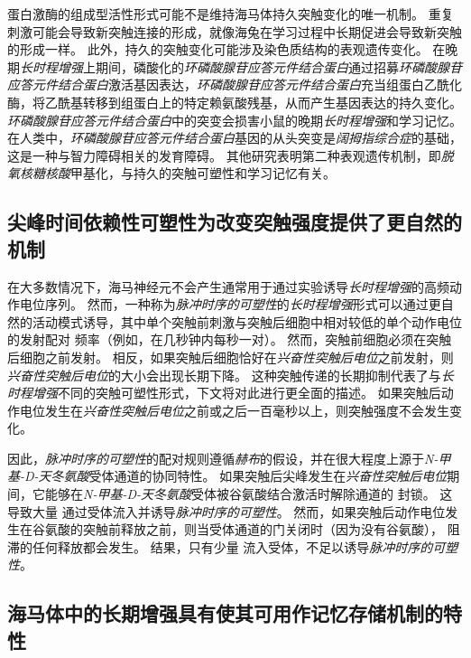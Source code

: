 蛋白激酶的组成型活性形式可能不是维持海马体持久突触变化的唯一机制。
重复刺激可能会导致新突触连接的形成，就像海兔在学习过程中长期促进会导致新突触的形成一样。
此外，持久的突触变化可能涉及染色质结构的表观遗传变化。
在晚期\textit{长时程增强}上期间，磷酸化的\textit{环磷酸腺苷应答元件结合蛋白}通过招募\textit{环磷酸腺苷应答元件结合蛋白}激活基因表达，\textit{环磷酸腺苷应答元件结合蛋白}充当组蛋白乙酰化酶，将乙酰基转移到组蛋白上的特定赖氨酸残基，从而产生基因表达的持久变化。
\textit{环磷酸腺苷应答元件结合蛋白}中的突变会损害小鼠的晚期\textit{长时程增强}和学习记忆。
在人类中，\textit{环磷酸腺苷应答元件结合蛋白}基因的从头突变是\textit{阔拇指综合症}的基础，这是一种与智力障碍相关的发育障碍。
其他研究表明第二种表观遗传机制，即\textit{脱氧核糖核酸}甲基化，与持久的突触可塑性和学习记忆有关。



\subsection{尖峰时间依赖性可塑性为改变突触强度提供了更自然的机制}

在大多数情况下，海马神经元不会产生通常用于通过实验诱导\textit{长时程增强}的高频动作电位序列。
然而，一种称为\textit{脉冲时序的可塑性}的\textit{长时程增强}形式可以通过更自然的活动模式诱导，其中单个突触前刺激与突触后细胞中相对较低的单个动作电位的发射配对 频率（例如，在几秒钟内每秒一对）。
然而，突触前细胞必须在突触后细胞之前发射。
相反，如果突触后细胞恰好在\textit{兴奋性突触后电位}之前发射，则\textit{兴奋性突触后电位}的大小会出现长期下降。
这种突触传递的长期抑制代表了与\textit{长时程增强}不同的突触可塑性形式，下文将对此进行更全面的描述。
如果突触后动作电位发生在\textit{兴奋性突触后电位}之前或之后一百毫秒以上，则突触强度不会发生变化。


因此，\textit{脉冲时序的可塑性}的配对规则遵循\textit{赫布}的假设，并在很大程度上源于\textit{N-甲基-D-天冬氨酸}受体通道的协同特性。
如果突触后尖峰发生在\textit{兴奋性突触后电位}期间，它能够在\textit{N-甲基-D-天冬氨酸}受体被谷氨酸结合激活时解除通道的  封锁。
这导致大量  通过受体流入并诱导\textit{脉冲时序的可塑性}。
然而，如果突触后动作电位发生在谷氨酸的突触前释放之前，则当受体通道的门关闭时（因为没有谷氨酸）， 阻滞的任何释放都会发生。
结果，只有少量  流入受体，不足以诱导\textit{脉冲时序的可塑性}。



\subsection{海马体中的长期增强具有使其可用作记忆存储机制的特性}

